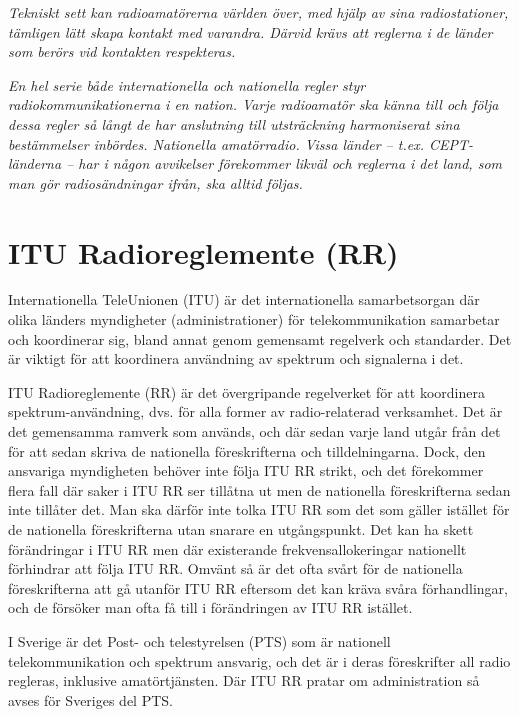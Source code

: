 \emph{Tekniskt sett kan radioamatörerna världen över, med hjälp av
  sina radiostationer, tämligen lätt skapa kontakt med
  varandra. Därvid krävs att reglerna i de länder som berörs vid
  kontakten respekteras.}

\emph{En hel serie både internationella och nationella regler styr
  radiokommunikationerna i en nation. Varje radioamatör ska känna
  till och följa dessa regler så långt de har anslutning till
  utsträckning harmoniserat sina bestämmelser inbördes.  Nationella
  amatörradio. Vissa länder -- t.ex. CEPT-länderna -- har i någon
  avvikelser förekommer likväl och reglerna i det land, som man gör
  radiosändningar ifrån, ska alltid följas.}

\section{ITU Radioreglemente (RR)}

Internationella TeleUnionen (ITU) är det internationella samarbetsorgan där
olika länders myndigheter (administrationer) för telekommunikation samarbetar
och koordinerar sig, bland annat genom gemensamt regelverk och standarder.
Det är viktigt för att koordinera användning av spektrum och signalerna i det.

ITU Radioreglemente (RR) \cite{ITU-RR} är det övergripande regelverket för att
koordinera spektrum-användning, dvs. för alla former av radio-relaterad
verksamhet. Det är det gemensamma ramverk som används, och där sedan varje land
utgår från det för att sedan skriva de nationella föreskrifterna och
tilldelningarna. Dock, den ansvariga myndigheten behöver inte följa ITU RR
strikt, och det förekommer flera fall där saker i ITU RR ser tillåtna ut men
de nationella föreskrifterna sedan inte tillåter det. Man ska därför inte
tolka ITU RR som det som gäller istället för de nationella föreskrifterna utan
snarare en utgångspunkt. Det kan ha skett förändringar i ITU RR men där
existerande frekvensallokeringar nationellt förhindrar att följa ITU RR.
Omvänt så är det ofta svårt för de nationella föreskrifterna att gå utanför
ITU RR eftersom det kan kräva svåra förhandlingar, och de försöker man ofta
få till i förändringen av ITU RR istället.

I Sverige är det Post- och telestyrelsen (PTS) som är nationell telekommunikation
och spektrum ansvarig, och det är i deras föreskrifter all radio regleras,
inklusive amatörtjänsten. Där ITU RR pratar om administration så avses för
Sveriges del PTS.

